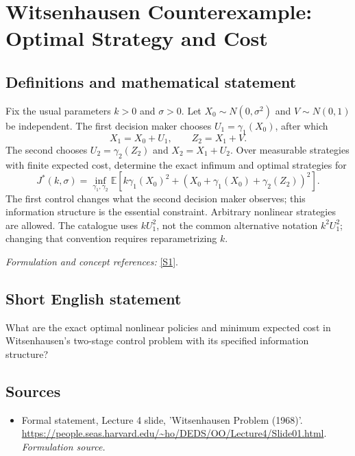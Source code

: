 \documentclass[11pt]{article}
\begin{document}
\section*{\texorpdfstring{Witsenhausen Counterexample: Optimal Strategy and Cost}{Witsenhausen Counterexample: Optimal Strategy and Cost}}\label{30006967}
\subsection{Definitions and mathematical statement}
Fix the usual parameters $k>0$ and $\sigma>0$. Let $X_0\sim N(0,\sigma^2)$ and $V\sim N(0,1)$ be independent. The first decision maker chooses $U_1=\gamma_1(X_0)$, after which
\[
 X_1=X_0+U_1,\qquad Z_2=X_1+V.
\]
The second chooses $U_2=\gamma_2(Z_2)$ and $X_2=X_1+U_2$. Over measurable strategies with finite expected cost, determine the exact infimum and optimal strategies for
\[
 J^*(k,\sigma)=\inf_{\gamma_1,\gamma_2}
 {\mathbb{E}}\left[k\gamma_1(X_0)^2+
       (X_0+\gamma_1(X_0)+\gamma_2(Z_2))^2\right].
\]
The first control changes what the second decision maker observes; this information structure is the essential constraint. Arbitrary nonlinear strategies are allowed. The catalogue uses $kU_1^2$, not the common alternative notation $k^2U_1^2$; changing that convention requires reparametrizing $k$.
\par\smallskip\textit{Formulation and concept references:} \href{https://people.seas.harvard.edu/~ho/DEDS/OO/Lecture4/Slide01.html}{[S1]}.

\subsection{Short English statement}
What are the exact optimal nonlinear policies and minimum expected cost in Witsenhausen's two-stage control problem with its specified information structure?
\subsection{Sources}
\begin{itemize}
\item[S1]Formal statement, Lecture 4 slide, 'Witsenhausen Problem (1968)'.
\url{https://people.seas.harvard.edu/~ho/DEDS/OO/Lecture4/Slide01.html}.
\textit{Formulation source.}
\end{itemize}
\end{document}
